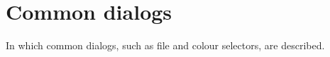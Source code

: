 \chapter{Common dialogs}\label{commondialogs}
%
%
\setfooter{\thepage}{}{}{}{}{\thepage}%

In which common dialogs, such as file and colour selectors, are described.

